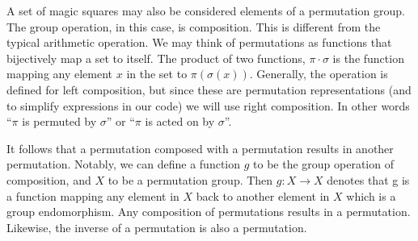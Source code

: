 \documentclass{rhumj_new}
\begin{document}


A set of magic squares may also be considered elements of a permutation group. The group
operation, in this case, is composition. This is different from the typical arithmetic operation.
We may think of permutations as functions that bijectively map a set to itself. The product of two
functions, $\pi\cdot\sigma$ is the function mapping any element $x$ in the set to
$\pi\left(\sigma\left(x\right)\right)$. Generally, the operation is defined for left composition,
but since these are permutation representations (and to simplify expressions in our code) we will
use right composition. In other words ``$\pi$ is permuted by $\sigma$'' or ``$\pi$ is acted on by
$\sigma$''.

It follows that a permutation composed with a permutation results in another permutation.
Notably, we can define a function $g$ to be the group operation of composition, and $X$ to be a
permutation group. Then $g:X\rightarrow X$ denotes that g is a function mapping any element in $X$
back to another element in $X$ which is a group endomorphism. Any composition of permutations
results in a permutation\cite{Deskins}. Likewise, the inverse of a permutation is also a permutation\cite{Deskins}.


\end{document}
